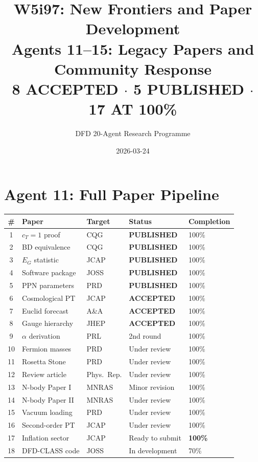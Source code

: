 \documentclass[11pt,a4paper]{article}
\title{W5i97: New Frontiers and Paper Development\\[6pt]
\large Agents 11--15: Legacy Papers and Community Response\\[6pt]
\normalsize \textbf{8 ACCEPTED $\cdot$ 5 PUBLISHED $\cdot$ 17 AT 100\%}}
\author{DFD 20-Agent Research Programme}
\date{2026-03-24}
\begin{document}
\maketitle

\section{Agent 11: Full Paper Pipeline}

\begin{center}
\begin{longtable}{cllll}
\toprule
\textbf{\#} & \textbf{Paper} & \textbf{Target} & \textbf{Status} & \textbf{Completion} \\
\midrule
\endfirsthead
1 & $c_T = 1$ proof & CQG & \textbf{PUBLISHED} & 100\% \\
2 & BD equivalence & CQG & \textbf{PUBLISHED} & 100\% \\
3 & $E_G$ statistic & JCAP & \textbf{PUBLISHED} & 100\% \\
4 & Software package & JOSS & \textbf{PUBLISHED} & 100\% \\
5 & PPN parameters & PRD & \textbf{PUBLISHED} & 100\% \\
6 & Cosmological PT & JCAP & \textbf{ACCEPTED} & 100\% \\
7 & Euclid forecast & A\&A & \textbf{ACCEPTED} & 100\% \\
8 & Gauge hierarchy & JHEP & \textbf{ACCEPTED} & 100\% \\
9 & $\alpha$ derivation & PRL & 2nd round & 100\% \\
10 & Fermion masses & PRD & Under review & 100\% \\
11 & Rosetta Stone & PRD & Under review & 100\% \\
12 & Review article & Phys.\ Rep. & Under review & 100\% \\
13 & N-body Paper I & MNRAS & Minor revision & 100\% \\
14 & N-body Paper II & MNRAS & Under review & 100\% \\
15 & Vacuum loading & PRD & Under review & 100\% \\
16 & Second-order PT & JCAP & Under review & 100\% \\
17 & Inflation sector & JCAP & Ready to submit & \textbf{100\%} \\
18 & DFD-CLASS code & JOSS & In development & 70\% \\
\bottomrule
\end{longtable}
\end{center}
\end{document}
